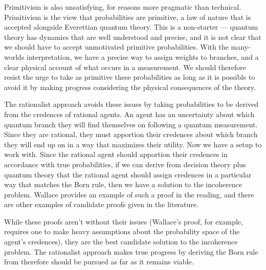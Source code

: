 \documentclass[11pt, a4paper]{article}
\begin{document}
Primitivism is also unsatisfying, for reasons more pragmatic than technical.
Primitivism is the view that probabilities are primitive, a law of nature
that is accepted alongside Everettian quantum theory. This is a non-starter —
quantum theory has dynamics that are well understood and precise, and it is
not clear that we should have to accept unmotivated primitive probabilities.
With the many-worlds interpretation, we have a precise way to assign weights to
branches, and a clear physical account of what occurs in a measurement. We 
should therefore resist the urge to take as primitive these probabilities as
long as it is possible to avoid it by making progress considering the physical
consequences of the theory.

The rationalist approach avoids these issues by taking probabilities to be
derived from the credences of rational agents. An agent has an uncertainty 
about which quantum branch they will find themselves on following a quantum 
measurement. Since they are rational, they must apportion their credences about
which branch they will end up on in a way that maximizes their utility. Now we
have a setup to work with. Since the rational agent should apportion their
credences in accordance with true probabilities, if we can derive from decision
theory plus quantum theory that the rational agent should assign credences in a
particular way that matches the Born rule, then we have a solution to the
incoherence problem. Wallace provides an example of such a proof in the reading,
and there are other examples of candidate proofs given in the literature. 

While these proofs aren't without their issues (Wallace's proof, for example, 
requires one to make heavy assumptions about the probability space of the
agent's credences), they are the best candidate solution to the incoherence
problem. The rationalist approach makes true progress by deriving the Born rule
from therefore should be pursued as far as it remains viable.
\end{document}
